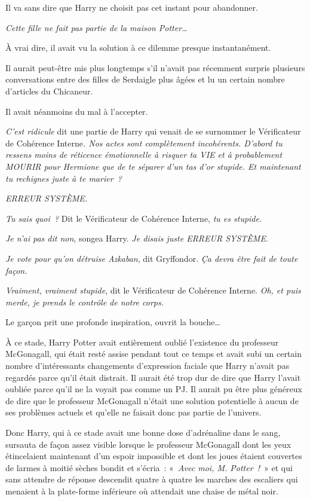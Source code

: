 Il va sans dire que Harry ne choisit pas cet instant pour abandonner.

\emph{Cette fille ne fait pas partie de la maison Potter…}

À vrai dire, il avait vu la solution à ce dilemme presque instantanément.

Il aurait peut-être mis plus longtemps s'il n'avait pas récemment surpris plusieurs conversations entre des filles de Serdaigle plus âgées et lu un certain nombre d'articles du Chicaneur.

Il avait néanmoins du mal à l'accepter.

\emph{C'est ridicule} dit une partie de Harry qui venait de se surnommer le Vérificateur de Cohérence Interne\emph{.
Nos actes sont complètement incohérents.
D'abord tu ressens moins de réticence émotionnelle à risquer ta VIE et à probablement MOURIR pour Hermione que de te séparer d'un tas d'or stupide.
Et maintenant tu rechignes juste à te marier~?}

\emph{ERREUR SYSTÈME.}

\emph{Tu sais quoi~?} Dit le Vérificateur de Cohérence Interne, \emph{tu es stupide.}

\emph{Je n'ai pas dit non}, songea Harry.
\emph{Je disais juste ERREUR SYSTÈME.}

\emph{Je vote pour qu'on détruise Azkaban}, dit Gryffondor.
\emph{Ça devra être fait de toute façon.}

\emph{Vraiment, vraiment stupide}, dit le Vérificateur de Cohérence Interne.
\emph{Oh, et puis merde, je prends le contrôle de notre corps.}

Le garçon prit une profonde inspiration, ouvrit la bouche…

À ce stade, Harry Potter avait entièrement oublié l'existence du professeur McGonagall, qui était resté assise pendant tout ce temps et avait subi un certain nombre d'intéressants changements d'expression faciale que Harry n'avait pas regardés parce qu'il était distrait.
Il aurait été trop dur de dire que Harry l'avait oubliée parce qu'il ne la voyait pas comme un PJ.
Il aurait pu être plus généreux de dire que le professeur McGonagall n'était une solution potentielle à aucun de ses problèmes actuels et qu'elle ne faisait donc pas partie de l'univers.

Donc Harry, qui à ce stade avait une bonne dose d'adrénaline dans le sang, sursauta de façon assez visible lorsque le professeur McGonagall dont les yeux étincelaient maintenant d'un espoir impossible et dont les joues étaient couvertes de larmes à moitié sèches bondit et s'écria~: «~\emph{Avec moi, M. Potter~!}~» et qui sans attendre de réponse descendit quatre à quatre les marches des escaliers qui menaient à la plate-forme inférieure où attendait une chaise de métal noir.

